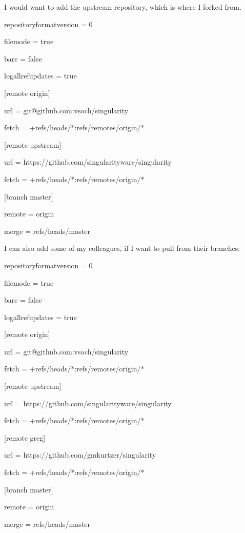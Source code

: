 \documentclass[letterpaper,10pt,english]{sphinxmanual}
\begin{document}
I would want to add the upstream repository, which is where I forked from.

%
\begin{sphinxVerbatim}[commandchars=\\\{\}]
[core]

    repositoryformatversion = 0

    filemode = true

    bare = false

    logallrefupdates = true

[remote \PYGZdq{}origin\PYGZdq{}]

    url = git@github.com:vsoch/singularity

    fetch = +refs/heads/*:refs/remotes/origin/*

[remote \PYGZdq{}upstream\PYGZdq{}]

    url = https://github.com/singularityware/singularity

    fetch = +refs/heads/*:refs/remotes/origin/*

[branch \PYGZdq{}master\PYGZdq{}]

    remote = origin

    merge = refs/heads/master
\end{sphinxVerbatim}

I can also add some of my colleagues, if I want to pull from their branches:

%
\begin{sphinxVerbatim}[commandchars=\\\{\}]
[core]

    repositoryformatversion = 0

    filemode = true

    bare = false

    logallrefupdates = true

[remote \PYGZdq{}origin\PYGZdq{}]

    url = git@github.com:vsoch/singularity

    fetch = +refs/heads/*:refs/remotes/origin/*

[remote \PYGZdq{}upstream\PYGZdq{}]

    url = https://github.com/singularityware/singularity

    fetch = +refs/heads/*:refs/remotes/origin/*

[remote \PYGZdq{}greg\PYGZdq{}]

    url = https://github.com/gmkurtzer/singularity

    fetch = +refs/heads/*:refs/remotes/origin/*

[branch \PYGZdq{}master\PYGZdq{}]

    remote = origin

    merge = refs/heads/master
\end{sphinxVerbatim}
\end{document}

